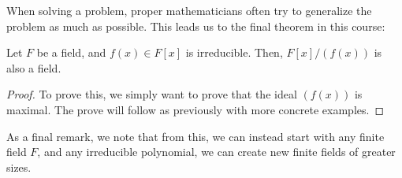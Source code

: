 \documentclass[openany]{book}
\begin{document}
When solving a problem, proper mathematicians often try to generalize the problem as much as possible. This leads us to the final theorem in this course:
\begin{thm}
	Let $F$ be a field, and $f(x) \in F[x]$ is irreducible. Then, $F[x] / (f(x))$ is also a field.
\end{thm}
\begin{proof}
	To prove this, we simply want to prove that the ideal $(f(x))$ is maximal. The prove will follow as previously with more concrete examples.
\end{proof}

\begin{rmk}
	As a final remark, we note that from this, we can instead start with any finite field $F$, and any irreducible polynomial, we can create new finite fields of greater sizes.
\end{rmk}
\end{document}
